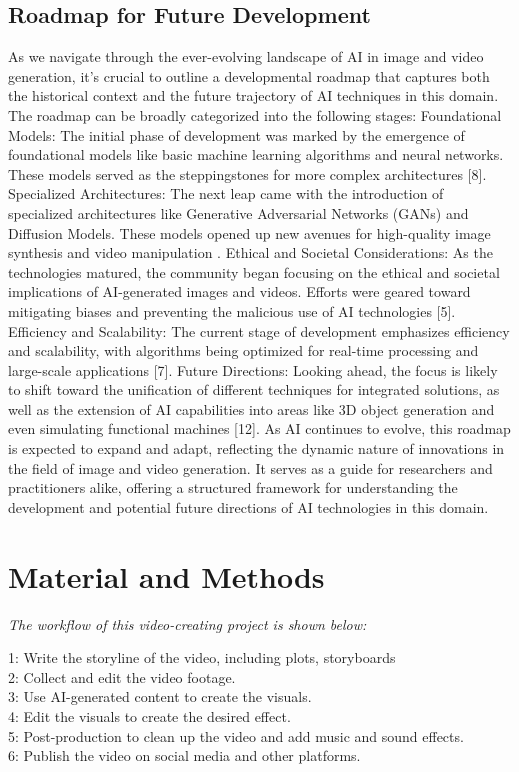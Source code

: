 \documentclass[11pt,a4paper,oneside]{report}
\newcommand{\instructions}[1]{{\color{black}\itshape #1}}
\begin{document}
\section{Roadmap for Future Development}
As we navigate through the ever-evolving landscape of AI in image and video generation, it's crucial to outline a developmental roadmap that captures both the historical context and the future trajectory of AI techniques in this domain. The roadmap can be broadly categorized into the following stages: Foundational Models: The initial phase of development was marked by the emergence of foundational models like basic machine learning algorithms and neural networks. These models served as the steppingstones for more complex architectures [8]. 
Specialized Architectures: The next leap came with the introduction of specialized architectures like Generative Adversarial Networks (GANs) and Diffusion Models. These models opened up new avenues for high-quality image synthesis and video manipulation \cite{granot2022drop}. 
Ethical and Societal Considerations: As the technologies matured, the community began focusing on the ethical and societal implications of AI-generated images and videos. Efforts were geared toward mitigating biases and preventing the malicious use of AI technologies [5]. 
Efficiency and Scalability: The current stage of development emphasizes efficiency and scalability, with algorithms being optimized for real-time processing and large-scale applications [7]. 
Future Directions: Looking ahead, the focus is likely to shift toward the unification of different techniques for integrated solutions, as well as the extension of AI capabilities into areas like 3D object generation and even simulating functional machines [12]. 
As AI continues to evolve, this roadmap is expected to expand and adapt, reflecting the dynamic nature of innovations in the field of image and video generation. It serves as a guide for researchers and practitioners alike, offering a structured framework for understanding the development and potential future directions of AI technologies in this domain. 



\chapter{Material and Methods}
\label{material-and-methods}

\instructions{The workflow of this video-creating project is shown below:

1: Write the storyline of the video, including plots, storyboards \\
2: Collect and edit the video footage.\\
3: Use AI-generated content to create the visuals. \\
4: Edit the visuals to create the desired effect. \\
5: Post-production to clean up the video and add music and sound effects. \\
6: Publish the video on social media and other platforms. \\
}
\end{document}
